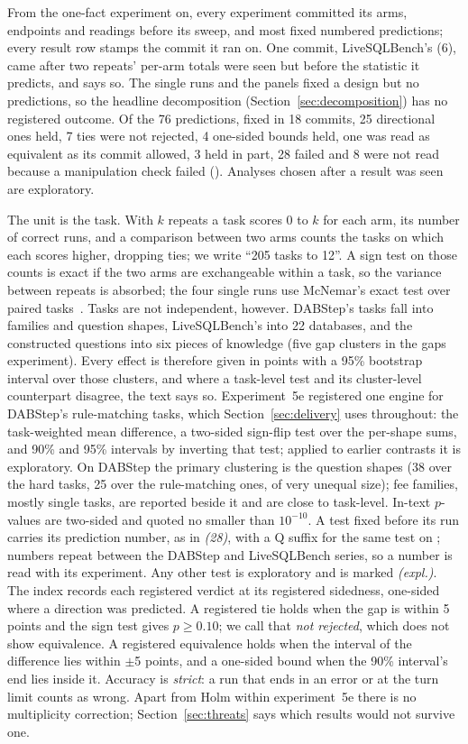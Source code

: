 From the one-fact experiment on, every experiment committed its arms,
endpoints and readings before its sweep, and most fixed numbered
predictions; every result row stamps the commit it ran on. One commit,
LiveSQLBench's (6), came after two repeats' per-arm totals were seen but
before the statistic it predicts, and says so. The single runs and the
panels fixed a design but no predictions, so the headline decomposition
(Section~\ref{sec:decomposition}) has no registered outcome. Of the 76
predictions, fixed in 18 commits, 25 directional ones held, 7 ties were
not rejected, 4 one-sided bounds held, one was read as equivalent as its
commit allowed, 3 held in part, 28 failed and 8 were not read because a
manipulation check failed (). Analyses chosen after a
result was seen are exploratory.

The unit is the task. With $k$ repeats a task scores 0 to $k$ for each
arm, its number of correct runs, and a comparison between two arms counts
the tasks on which each scores higher, dropping ties; we write ``205 tasks
to 12''. A sign test on those counts is exact if the two arms are
exchangeable within a task, so the variance between repeats is absorbed;
the four single runs use McNemar's exact test over paired
tasks~\cite{mcnemar,dietterich}. Tasks are not independent, however.
DABStep's tasks fall into families and question shapes, LiveSQLBench's
into 22 databases, and the constructed questions into six pieces of
knowledge (five gap clusters in the gaps experiment). Every effect is
therefore given in points with a 95\% bootstrap interval over those
clusters, and where a task-level test and its cluster-level counterpart
disagree, the text says so. Experiment~5e registered one engine for
DABStep's rule-matching tasks, which Section~\ref{sec:delivery} uses
throughout: the task-weighted mean difference, a two-sided sign-flip test
over the per-shape sums, and 90\% and 95\% intervals by inverting that
test; applied to earlier contrasts it is exploratory. On DABStep the primary clustering is the
question shapes (38 over the hard tasks, 25 over the rule-matching ones, of
very unequal size); fee families, mostly single tasks, are reported beside
it and are close to task-level. In-text $p$-values are two-sided and quoted no
smaller than $10^{-10}$. A test fixed before its run carries its
prediction number, as in \emph{(28)}, with a Q suffix for the same test on
\mQwen{}; numbers repeat between the DABStep and LiveSQLBench series, so a
number is read with its experiment. Any other test is exploratory and is
marked \emph{(expl.)}. The index records each registered verdict at its
registered sidedness, one-sided where a direction was predicted. A
registered tie holds when the gap is within 5 points and the sign test
gives $p \geq 0.10$; we call that \emph{not rejected}, which does not show
equivalence. A registered equivalence holds when the interval of the
difference lies within $\pm$5 points, and a one-sided bound when the 90\%
interval's end lies inside it. Accuracy is \emph{strict}: a run
that ends in an error or at the turn limit counts as wrong. Apart from Holm within experiment~5e there is no multiplicity correction; Section~\ref{sec:threats} says which results would not survive one.

